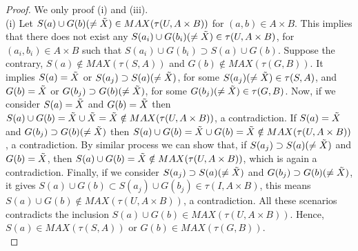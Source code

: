\documentclass{article}
\theoremstyle{definition}
\begin{document}
\begin{proof}

 We only proof (i) and (iii). \\

(i) Let $S(a)\cup G(b)(\neq \Tilde{X}) \in MAX(\tau(U,A\times B))$ for $(a, b)\in A\times B$. This implies that there does not exist any $S(a_i)\cup G(b_i)(\neq \Tilde{X})\in \tau(U,A\times B)$, for $(a_i, b_i)\in A\times B$ such that $S(a_i)\cup G(b_i)\supset S(a)\cup G(b)$. Suppose the contrary, $S(a) \notin MAX(\tau(S,A))$ and $G(b) \notin MAX(\tau(G,B))$. It implies $S(a)= \Tilde{X}$ or  $S(a_j)\supset S(a)(\neq \Tilde{X})$, for some $S(a_j) (\neq \Tilde{X}) \in \tau(S,A)$, and $G(b)= \Tilde{X}$ or $G(b_j)\supset G(b)(\neq \Tilde{X})$, for some  $G(b_j) (\neq \Tilde{X}) \in \tau(G,B)$. Now, if we consider $S(a)= \Tilde{X}$ and $G(b)= \Tilde{X}$ then $S(a) \cup G(b)= \Tilde{X} \cup \Tilde{X}=\Tilde{X}\notin MAX(\tau(U,A\times B))$, a contradiction. If $S(a)= \Tilde{X}$ and $G(b_j)\supset G(b)(\neq \Tilde{X})$ then $S(a) \cup G(b) = \Tilde{X} \cup G(b)= \Tilde{X} \notin MAX(\tau(U,A\times B))$, a contradiction. By similar process we can show that, if $S(a_j)\supset S(a)(\neq \Tilde{X})$ and $G(b)= \Tilde{X}$, then $S(a)\cup G(b)= \Tilde{X} \notin MAX(\tau(U,A\times B))$, which is again a contradiction. Finally, if we consider $S(a_j)\supset S(a)(\neq \Tilde{X})$ and $G(b_j)\supset G(b)(\neq \Tilde{X})$, it gives $S(a) \cup G(b)  \subset S(a_j)\cup G(b_j) \in \tau(I, A\times B)$, this means $S(a)\cup G(b) \notin MAX(\tau(U,A\times B))$, a contradiction. All these scenarios contradicts the inclusion $S(a)\cup G(b) \in MAX(\tau(U,A\times B))$. Hence, $S(a) \in MAX(\tau(S,A))$ or $G(b) \in MAX(\tau(G,B))$.\\




\end{proof}
\end{document}
